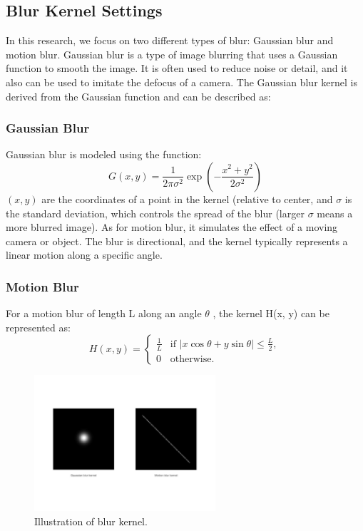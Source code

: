\documentclass[twoside,11pt]{article}
\begin{document}
\subsection{Blur Kernel Settings}
In this research, we focus on two different types of blur: Gaussian blur and motion blur.
Gaussian blur is a type of image blurring that uses a Gaussian function to smooth the image. It is often used to reduce noise or detail, and it also can be used to imitate the defocus of a camera.
The Gaussian blur kernel is derived from the Gaussian function and can be described as:

\subsubsection{Gaussian Blur}
Gaussian blur is modeled using the function:
\[
G(x, y) = \frac{1}{2\pi\sigma^2} \exp\left(-\frac{x^2 + y^2}{2\sigma^2}\right)
\]
 \( (x, y) \) are the coordinates of a point in the kernel (relative to center, and \( \sigma \) is the standard deviation, which controls the spread of the blur (larger  \( \sigma \) means a more blurred image).
As for motion blur, it simulates the effect of a moving camera or object. The blur is directional, and the kernel typically represents a linear motion along a specific angle.

\subsubsection{Motion Blur}
For a motion blur of length  L  along an angle \(\theta\) , the kernel  H(x, y)  can be represented as:
\[
H(x, y) =
\begin{cases}
\frac{1}{L} & \text{if } |x \cos \theta + y \sin \theta| \leq \frac{L}{2}, \\
0 & \text{otherwise}.
\end{cases}
\]

\begin{figure}[H]
\centering
\includegraphics[width=0.6\textwidth]{figure5.jpg}
\caption{Illustration of blur kernel.}
\end{figure}
\end{document}
